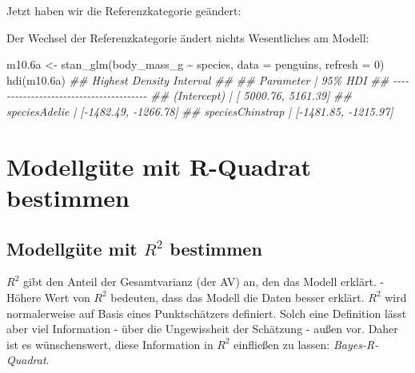 \documentclass[
  a4paper,
  DIV=11]{scrreprt}
\newenvironment{Shaded}{\begin{snugshade}}{\end{snugshade}}
\newcommand{\AttributeTok}[1]{\textcolor[rgb]{0.40,0.45,0.13}{#1}}
\newcommand{\DecValTok}[1]{\textcolor[rgb]{0.68,0.00,0.00}{#1}}
\newcommand{\DocumentationTok}[1]{\textcolor[rgb]{0.37,0.37,0.37}{\textit{#1}}}
\newcommand{\FloatTok}[1]{\textcolor[rgb]{0.68,0.00,0.00}{#1}}
\newcommand{\FunctionTok}[1]{\textcolor[rgb]{0.28,0.35,0.67}{#1}}
\newcommand{\NormalTok}[1]{\textcolor[rgb]{0.00,0.23,0.31}{#1}}
\newcommand{\OtherTok}[1]{\textcolor[rgb]{0.00,0.23,0.31}{#1}}
\newcommand{\SpecialCharTok}[1]{\textcolor[rgb]{0.37,0.37,0.37}{#1}}
\theoremstyle{definition}
\theoremstyle{remark}
\begin{document}
Jetzt haben wir die Referenzkategorie geändert:

\begin{Shaded}
\end{Shaded}

Der Wechsel der Referenzkategorie ändert nichts Wesentliches am Modell:

\begin{Shaded}
\begin{Highlighting}[]
\NormalTok{m10}\FloatTok{.6}\NormalTok{a }\OtherTok{\textless{}{-}} \FunctionTok{stan\_glm}\NormalTok{(body\_mass\_g }\SpecialCharTok{\textasciitilde{}}\NormalTok{ species, }\AttributeTok{data =}\NormalTok{ penguins, }\AttributeTok{refresh =} \DecValTok{0}\NormalTok{)}
\FunctionTok{hdi}\NormalTok{(m10}\FloatTok{.6}\NormalTok{a)}
\DocumentationTok{\#\# Highest Density Interval}
\DocumentationTok{\#\# }
\DocumentationTok{\#\# Parameter        |              95\% HDI}
\DocumentationTok{\#\# {-}{-}{-}{-}{-}{-}{-}{-}{-}{-}{-}{-}{-}{-}{-}{-}{-}{-}{-}{-}{-}{-}{-}{-}{-}{-}{-}{-}{-}{-}{-}{-}{-}{-}{-}{-}{-}{-}{-}}
\DocumentationTok{\#\# (Intercept)      | [ 5000.76,  5161.39]}
\DocumentationTok{\#\# speciesAdelie    | [{-}1482.49, {-}1266.78]}
\DocumentationTok{\#\# speciesChinstrap | [{-}1481.85, {-}1215.97]}
\end{Highlighting}
\end{Shaded}

\hypertarget{modellguxfcte-mit-r-quadrat-bestimmen}{%
\section{Modellgüte mit R-Quadrat
bestimmen}\label{modellguxfcte-mit-r-quadrat-bestimmen}}

\hypertarget{modellguxfcte-mit-r2-bestimmen}{%
\subsection{\texorpdfstring{Modellgüte mit \(R^2\)
bestimmen}{Modellgüte mit R\^{}2 bestimmen}}\label{modellguxfcte-mit-r2-bestimmen}}

\(R^2\) gibt den Anteil der Gesamtvarianz (der AV) an, den das Modell
erklärt. - Höhere Wert von \(R^2\) bedeuten, dass das Modell die Daten
besser erklärt. \(R^2\) wird normalerweise auf Basis eines
Punktschätzers definiert. Solch eine Definition lässt aber viel
Information - über die Ungewissheit der Schätzung - außen vor. Daher ist
es wünschenswert, diese Information in \(R^2\) einfließen zu lassen:
\emph{Bayes-R-Quadrat}.
\end{document}
